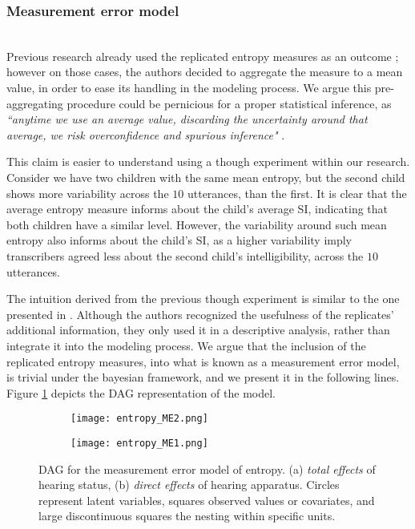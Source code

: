 \subsubsection{Measurement error model} \\
%
Previous research already used the replicated entropy measures as an outcome \citep{Boonen_et_al_2021, Faes_et_al_2021}; however on those cases, the authors decided to aggregate the measure to a mean value, in order to ease its handling in the modeling process. We argue this pre-aggregating procedure could be pernicious for a proper statistical inference, as \textit{``anytime we use an average value, discarding the uncertainty around that average, we risk overconfidence and spurious inference"} \citep{McElreath_2020}. 

This claim is easier to understand using a though experiment within our research.  Consider we have two children with the same mean entropy, but the second child shows more variability across the $10$ utterances, than the first. It is clear that the average entropy measure informs about the child's average SI, indicating that both children have a similar level. However, the variability around such mean entropy also informs about the child's SI, as a higher variability imply transcribers agreed less about the second child's intelligibility, across the $10$ utterances. 

The intuition derived from the previous though experiment is similar to the one presented in \citet{Boonen_et_al_2021}. Although the authors recognized the usefulness of the replicates' additional information, they only used it in a descriptive analysis, rather than integrate it into the modeling process. We argue that the inclusion of the replicated entropy measures, into what is known as a measurement error model, is trivial under the bayesian framework, and we present it in the following lines. Figure \ref{fig:entropy_ME} depicts the DAG representation of the model.
%
\begin{figure}[h]
	\centering
	\begin{subfigure}{0.435\textwidth}
		\centering
		\texttt{[image: entropy\_ME2.png]}
		\caption{}
	\end{subfigure}
	\hfill
	\begin{subfigure}{0.5\textwidth}
		\centering
		\texttt{[image: entropy\_ME1.png]}
		\caption{}
	\end{subfigure}
	\caption[DAG for the measurement error model of entropy.]%
	{DAG for the measurement error model of entropy. (a) \textit{total effects} of hearing status, (b) \textit{direct effects} of hearing apparatus. Circles represent latent variables, squares observed values or covariates, and large discontinuous squares the nesting within specific units.}
	\label{fig:entropy_ME}
\end{figure}
%

